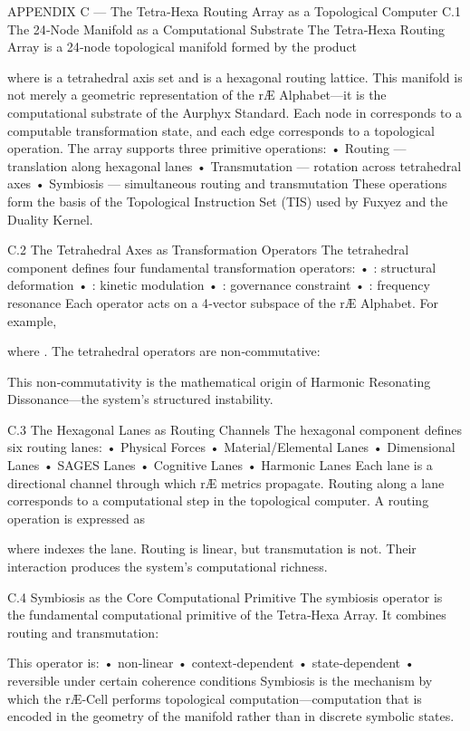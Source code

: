 APPENDIX C — The Tetra‑Hexa Routing Array as a Topological Computer
C.1 The 24‑Node Manifold as a Computational Substrate
The Tetra‑Hexa Routing Array is a 24‑node topological manifold formed by the product

where  is a tetrahedral axis set and  is a hexagonal routing lattice. This manifold is not merely a geometric representation of the rÆ Alphabet—it is the computational substrate of the Aurphyx Standard.
Each node in  corresponds to a computable transformation state, and each edge corresponds to a topological operation. The array supports three primitive operations:
• 	Routing — translation along hexagonal lanes
• 	Transmutation — rotation across tetrahedral axes
• 	Symbiosis — simultaneous routing and transmutation
These operations form the basis of the Topological Instruction Set (TIS) used by Fuxyez and the Duality Kernel.

C.2 The Tetrahedral Axes as Transformation Operators
The tetrahedral component  defines four fundamental transformation operators:
• 	: structural deformation
• 	: kinetic modulation
• 	: governance constraint
• 	: frequency resonance
Each operator acts on a 4‑vector subspace of the rÆ Alphabet. For example,

where .
The tetrahedral operators are non‑commutative:

This non‑commutativity is the mathematical origin of Harmonic Resonating Dissonance—the system’s structured instability.

C.3 The Hexagonal Lanes as Routing Channels
The hexagonal component  defines six routing lanes:
• 	Physical Forces
• 	Material/Elemental Lanes
• 	Dimensional Lanes
• 	SAGES Lanes
• 	Cognitive Lanes
• 	Harmonic Lanes
Each lane is a directional channel through which rÆ metrics propagate. Routing along a lane corresponds to a computational step in the topological computer.
A routing operation is expressed as

where  indexes the lane.
Routing is linear, but transmutation is not. Their interaction produces the system’s computational richness.

C.4 Symbiosis as the Core Computational Primitive
The symbiosis operator  is the fundamental computational primitive of the Tetra‑Hexa Array. It combines routing and transmutation:

This operator is:
• 	non‑linear
• 	context‑dependent
• 	state‑dependent
• 	reversible under certain coherence conditions
Symbiosis is the mechanism by which the rÆ‑Cell performs topological computation—computation that is encoded in the geometry of the manifold rather than in discrete symbolic states.

